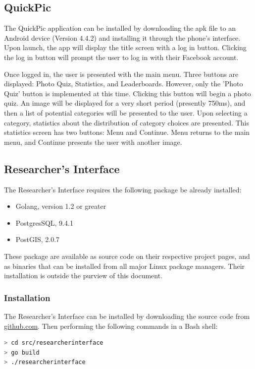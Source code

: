 \documentclass{article}
\begin{document}
\subsection{QuickPic}

The QuickPic application can be installed by downloading the apk file to an
Android device (Version 4.4.2) and installing it through the phone's
interface. Upon launch, the app will display the title screen with a log in
button. Clicking the log in button will prompt the user to log in with their
Facebook account.

Once logged in, the user is presented with the main menu. Three buttons are
displayed: Photo Quiz, Statistics, and Leaderboards. However, only the 'Photo
Quiz' button is implemented at this time. Clicking this button will begin a
photo quiz. An image will be displayed for a very short period (presently
750ms), and then a list of potential categories will be presented to the
user. Upon selecting a category, statistics about the distribution of category
choices are presented. This statistics screen has two buttons: Menu and
Continue. Menu returns to the main menu, and Continue presents the user with
another image.

\subsection{Researcher's Interface}

The Researcher's Interface requires the following package be already installed:
\begin{itemize}
	\item Golang, version 1.2 or greater
	\item PostgresSQL, 9.4.1
	\item PostGIS, 2.0.7
\end{itemize}
These package are available as source code on their respective project pages,
and as binaries that can be installed from all major Linux package managers.
Their installation is outside the purview of this document.

\subsubsection{Installation}

The Researcher's Interface can be installed by downloading the source code
from \href{http://www.github.com/QuesoTech/PhotoHunter}{github.com}.
Then performing the following commands in a Bash shell:
\begin{lstlisting}[language=bash]
> cd src/researcherinterface
> go build
> ./researcherinterface
\end{lstlisting}
\end{document}
